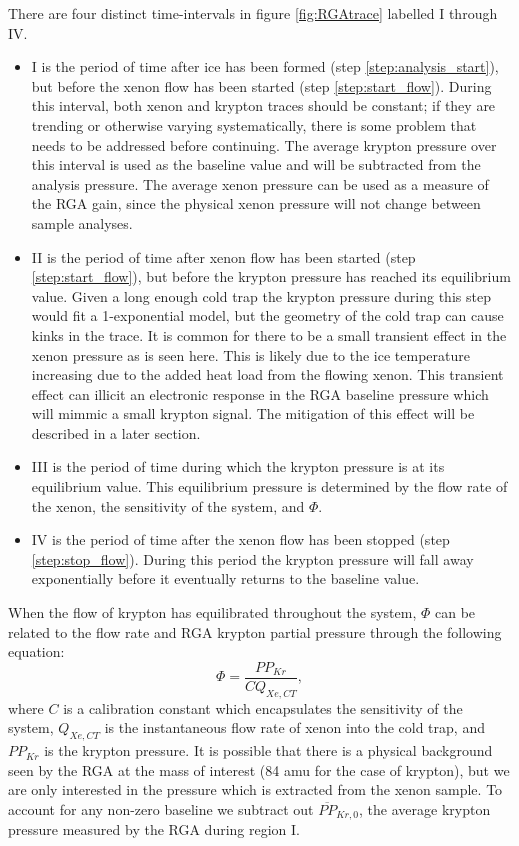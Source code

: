 \documentclass[12pt]{article}
\begin{document}
There are four distinct time-intervals in figure \ref{fig:RGAtrace} labelled I through IV. 
\begin{itemize}
\item I is the period of time after ice has been formed (step \ref{step:analysis_start}), but before the xenon flow has been started (step \ref{step:start_flow}). During this interval, both xenon and krypton traces should be constant; if they are trending or otherwise varying systematically, there is some problem that needs to be addressed before continuing. The average krypton pressure over this interval is used as the baseline value and will be subtracted from the analysis pressure. The average xenon pressure can be used as a measure of the RGA gain, since the physical xenon pressure will not change between sample analyses. 
\item II is the period of time after xenon flow has been started (step \ref{step:start_flow}), but before the krypton pressure has reached its equilibrium value. Given a long enough cold trap the krypton pressure during this step would fit a 1-exponential model, but the geometry of the cold trap can cause kinks in the trace. It is common for there to be a small transient effect in the xenon pressure as is seen here. This is likely due to the ice temperature increasing due to the added heat load from the flowing xenon. This transient effect can illicit an electronic response in the RGA baseline pressure which will mimmic a small krypton signal. The mitigation of this effect will be described in a later section.
\item III is the period of time during which the krypton pressure is at its equilibrium value. This equilibrium pressure is determined by the flow rate of the xenon, the sensitivity of the system, and $\Phi$.
\item IV is the period of time after the xenon flow has been stopped (step \ref{step:stop_flow}). During this period the krypton pressure will fall away exponentially before it eventually returns to the baseline value.
\end{itemize}

When the flow of krypton has equilibrated throughout the system, $\Phi$ can be related to the flow rate and RGA krypton partial pressure through the following equation: 
\begin{equation}
\label{eq:basic_analysis}
\Phi=\frac{PP_{Kr}}{CQ_{Xe,CT}},
\end{equation}
where $C$ is a calibration constant which encapsulates the sensitivity of the system, $Q_{Xe,CT}$ is the instantaneous flow rate of xenon into the cold trap, and $PP_{Kr}$ is the krypton pressure. It is possible that there is a physical background seen by the RGA at the mass of interest (84 amu for the case of krypton), but we are only interested in the pressure which is extracted from the xenon sample. To account for any non-zero baseline we subtract out $\overline{PP}_{Kr,0}$, the average krypton pressure measured by the RGA during region I. 
\end{document}
